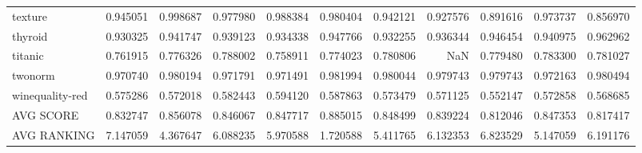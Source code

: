 \begin{tabular}{lrrrrrrrrrr}
texture         &   0.945051 &  0.998687 &  0.977980 &  0.988384 &  0.980404 &  0.942121 &  0.927576 &  0.891616 &  0.973737 &  0.856970 \\
thyroid         &   0.930325 &  0.941747 &  0.939123 &  0.934338 &  0.947766 &  0.932255 &  0.936344 &  0.946454 &  0.940975 &  0.962962 \\
titanic         &   0.761915 &  0.776326 &  0.788002 &  0.758911 &  0.774023 &  0.780806 &       NaN &  0.779480 &  0.783300 &  0.781027 \\
twonorm         &   0.970740 &  0.980194 &  0.971791 &  0.971491 &  0.981994 &  0.980044 &  0.979743 &  0.979743 &  0.972163 &  0.980494 \\
winequality-red &   0.575286 &  0.572018 &  0.582443 &  0.594120 &  0.587863 &  0.573479 &  0.571125 &  0.552147 &  0.572858 &  0.568685 \\
AVG SCORE       &   0.832747 &  0.856078 &  0.846067 &  0.847717 &  0.885015 &  0.848499 &  0.839224 &  0.812046 &  0.847353 &  0.817417 \\
AVG RANKING     &   7.147059 &  4.367647 &  6.088235 &  5.970588 &  1.720588 &  5.411765 &  6.132353 &  6.823529 &  5.147059 &  6.191176 \\
\bottomrule
\end{tabular}
